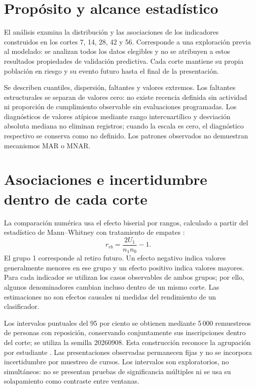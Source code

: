 \section{Propósito y alcance estadístico}
El análisis examina la distribución y las asociaciones de los indicadores construidos en los cortes 7, 14, 28, 42 y 56. Corresponde a una exploración previa al modelado: se analizan todos los datos elegibles y no se atribuyen a estos resultados propiedades de validación predictiva. Cada corte mantiene su propia población en riesgo y su evento futuro hasta el final de la presentación.

Se describen cuantiles, dispersión, faltantes y valores extremos. Los faltantes estructurales se separan de valores cero: no existe recencia definida sin actividad ni proporción de cumplimiento observable sin evaluaciones programadas. Los diagnósticos de valores atípicos mediante rango intercuartílico y desviación absoluta mediana no eliminan registros; cuando la escala es cero, el diagnóstico respectivo se conserva como no definido. Los patrones observados no demuestran mecanismos MAR o MNAR.

\section{Asociaciones e incertidumbre dentro de cada corte}
La comparación numérica usa el efecto biserial por rangos, calculado a partir del estadístico de Mann--Whitney con tratamiento de empates \cite{revscipy}:
\[
r_{rb}=\frac{2U_1}{n_1n_0}-1.
\]
El grupo 1 corresponde al retiro futuro. Un efecto negativo indica valores generalmente menores en ese grupo y un efecto positivo indica valores mayores. Para cada indicador se utilizan los casos observables de ambos grupos; por ello, algunos denominadores cambian incluso dentro de un mismo corte. Las estimaciones no son efectos causales ni medidas del rendimiento de un clasificador.

Los intervalos puntuales del 95 por ciento se obtienen mediante 5\,000 remuestreos de personas con reposición, conservando conjuntamente sus inscripciones dentro del corte; se utiliza la semilla 20260908. Esta construcción reconoce la agrupación por estudiante \cite{revfield2007}. Las presentaciones observadas permanecen fijas y no se incorpora incertidumbre por muestreo de cursos. Los intervalos son exploratorios, no simultáneos: no se presentan pruebas de significancia múltiples ni se usa su solapamiento como contraste entre ventanas.

